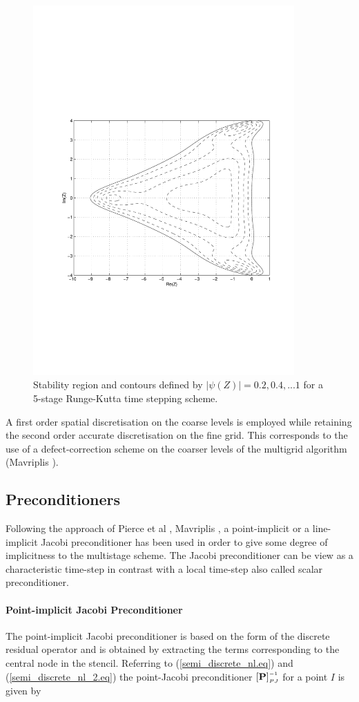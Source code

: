 %
\begin{figure}[ht]
   \centerline{\includegraphics[width=100mm,clip=t]{APPEND/FIGURE/rk5.pdf}}
   \caption{Stability region and contours defined by
   $\left|\psi\left(Z\right)\right|=0.2, 0.4, ... 1$ for a 5-stage Runge-Kutta
    time stepping scheme.}
   \label{rk5.fig}
\end{figure}
%
 A first order spatial discretisation on the coarse levels is employed
 while retaining the second order accurate discretisation on the fine
 grid. This corresponds to the use of a defect-correction scheme on
 the coarser levels of the multigrid algorithm
 (Mavriplis ).
%
%
%
\subsection{Preconditioners}
%
 Following the approach of Pierce et al \citeyear{Giles:11},
 Mavriplis \citeyear{Mavriplis:6,Mavriplis:7},
 a point-implicit or a line-implicit Jacobi preconditioner has been
 used in order to give some degree of implicitness to the multistage
 scheme. The Jacobi preconditioner can be view as a characteristic
 time-step in contrast with a local time-step also called scalar
 preconditioner.
%
\paragraph{Point-implicit Jacobi Preconditioner}
%
 The point-implicit Jacobi preconditioner is based on the form of the discrete
 residual operator and is obtained by extracting the terms corresponding
 to the central node in the stencil.
 Referring to (\ref{semi_discrete_nl.eq}) and (\ref{semi_discrete_nl_2.eq})
 the point-Jacobi preconditioner $\left[{\bf P}\right]^{\mbox{\tiny $-1$}}_{\mbox{\tiny $PJ$}}$ for a point $I$ is given by

